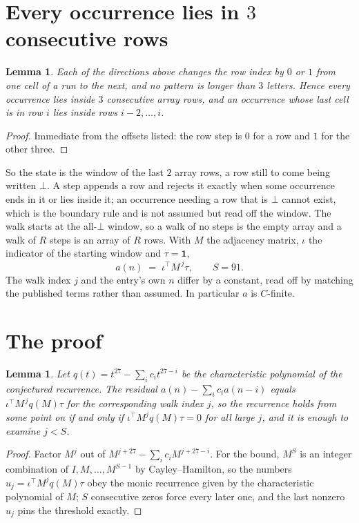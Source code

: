 \documentclass[11pt,a4paper]{article}
\theoremstyle{plain}
\newtheorem{lemma}[theorem]{Lemma}
\theoremstyle{definition}
\begin{document}
\section{Every occurrence lies in $3$ consecutive rows}

\begin{lemma}\label{lem:win}
Each of the directions above changes the row index by $0$ or $1$ from one cell of a run to the
next, and no pattern is longer than $3$ letters. Hence every occurrence lies inside $3$
consecutive array rows, and an occurrence whose last cell is in row $i$ lies inside rows
$i-2,\dots,i$.
\end{lemma}

\begin{proof}
Immediate from the offsets listed: the row step is $0$ for a row and $1$ for the other three.
\end{proof}

So the state is the window of the last $2$ array rows, a row still to come being written
$\bot$. A step appends a row and rejects it exactly when some occurrence ends in it or lies
inside it; an occurrence needing a row that is $\bot$ cannot exist, which is the boundary rule
and is not assumed but read off the window. The walk starts at the all-$\bot$ window, so a walk
of no steps is the empty array and a walk of $R$ steps is an array of $R$ rows. With $M$ the
adjacency matrix, $\iota$ the indicator of the starting window and $\tau=\mathbf{1}$,
\[
a(n)\;=\;\iota^{\!\top}M^{\,j}\tau ,\qquad S=91.
\]
The walk index $j$ and the entry's own $n$ differ by a constant, read off by matching the
published terms rather than assumed. In particular $a$ is $C$-finite.

\section{The proof}

\begin{lemma}\label{lem:crit}
Let $q(t)=t^{27}-\sum_i c_it^{27-i}$ be the characteristic polynomial of the
conjectured recurrence. The residual $a(n)-\sum_ic_ia(n-i)$ equals
$\iota^{\!\top}M^{\,j}q(M)\tau$ for the corresponding walk index $j$, so the recurrence
holds from some point on if and only if $\iota^{\!\top}M^{j}q(M)\tau=0$ for all large $j$,
and it is enough to examine $j<S$.
\end{lemma}

\begin{proof}
Factor $M^{j}$ out of $M^{j+27}-\sum_ic_iM^{j+27-i}$. For the bound, $M^{S}$
is an integer combination of $I,M,\dots,M^{S-1}$ by Cayley--Hamilton, so the numbers
$u_j=\iota^{\!\top}M^{j}q(M)\tau$ obey the monic recurrence given by the characteristic
polynomial of $M$; $S$ consecutive zeros force every later one, and the last nonzero $u_j$
pins the threshold exactly.
\end{proof}
\end{document}
